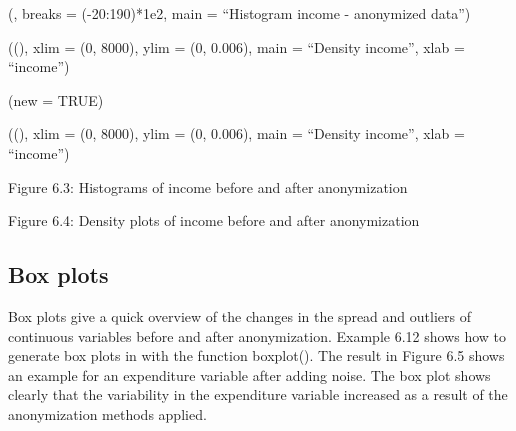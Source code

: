 \documentclass[letterpaper,10pt,english]{sphinxmanual}
\begin{document}
\begin{DUlineblock}{0em}
\item[] 
\item[] (, breaks = (-20:190)*1e2, main =
“Histogram income - anonymized data”)
\end{DUlineblock}

\begin{DUlineblock}{0em}
\item[] 
\item[] 
\item[] ((), xlim = (0,
8000), ylim = (0, 0.006), main = “Density income”, xlab =
“income”)
\item[] (new = TRUE)
\item[] 
\item[] ((), xlim =
(0, 8000), ylim = (0, 0.006), main = “Density income”,
xlab = “income”)
\end{DUlineblock}

\noindent{}

Figure 6.3: Histograms of income before and after anonymization

\noindent{}

Figure 6.4: Density plots of income before and after anonymization


\subsection{Box plots}
\label{\detokenize{utility:box-plots}}
Box plots give a quick overview of the changes in the spread and
outliers of continuous variables before and after anonymization. Example
6.12 shows how to generate box plots in  with the function boxplot().
The result in Figure 6.5 shows an example for an expenditure variable
after adding noise. The box plot shows clearly that the variability in
the expenditure variable increased as a result of the anonymization
methods applied.
\end{document}
